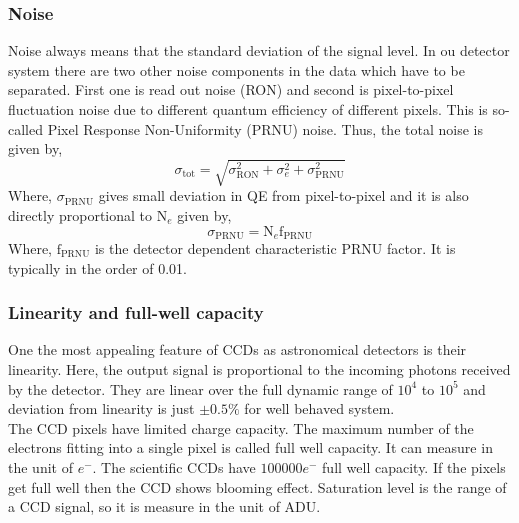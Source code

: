 \subsubsection{Noise}
Noise always means that the standard deviation of the signal level. In ou detector system there are two other noise components in the data which have to be separated. First one is read out noise (RON) and second is pixel-to-pixel fluctuation noise due to different quantum efficiency of different pixels. This is so-called Pixel Response Non-Uniformity (PRNU) noise. Thus, the total noise is given by,
\begin{equation}
\sigma_{\text{tot}}=\sqrt{ \sigma^2_{\text{RON}} + \sigma^2_{e} + \sigma^2_\text{PRNU}}
\end{equation}
Where, $ \sigma_{\text{PRNU}} $ gives small deviation in QE from pixel-to-pixel and it is also directly proportional to $ \text{N}_{e} $ given by,
\begin{equation}
\sigma_{\text{PRNU}}=\text{N}_{e} \text{f}_{\text{PRNU}}
\end{equation} 
Where, $ \text{f}_{\text{PRNU}} $ is the detector dependent characteristic PRNU factor. It is typically in the order of 0.01.

\subsubsection{Linearity and full-well capacity}
One the most appealing feature of CCDs as astronomical detectors is their linearity. Here, the output signal is proportional to the incoming photons received by the detector. They are linear over the full dynamic range of $10^4 $ to $10^5 $ and deviation from linearity is just $\pm 0.5 \%$  for well behaved system.\\
 
 The CCD pixels have limited charge capacity. The maximum number of the electrons fitting into a single pixel is called full well capacity. It can measure in the unit of $ e^{-} $. The  scientific CCDs have $ 100000 e^{-} $ full well capacity. If the pixels get full well then the CCD shows blooming effect. Saturation level is the range of a CCD signal, so it is measure in the unit of ADU.  
